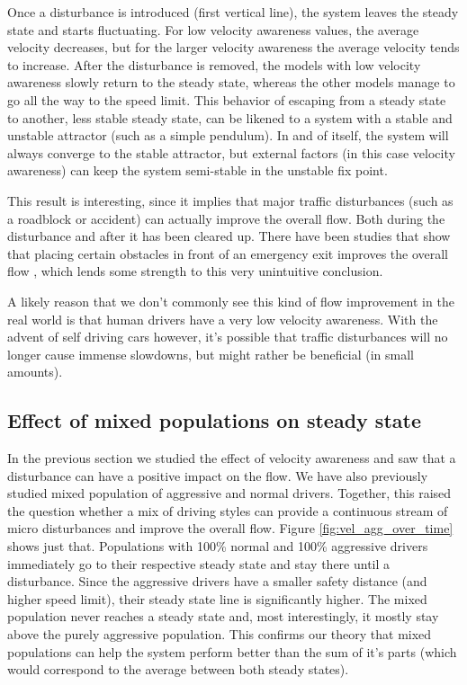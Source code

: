 \documentclass[11pt,a4paper,twocolumn]{article}
\begin{document}
Once a disturbance is introduced (first vertical line), the system leaves the steady state and starts fluctuating. For low velocity awareness values, the average velocity decreases, but for the larger velocity awareness the average velocity tends to increase.
After the disturbance is removed, the models with low velocity awareness slowly return to the steady state, whereas the other models manage to go all the way to the speed limit. This behavior of escaping from a steady state to another, less stable steady state, can be likened to a system with a stable and unstable attractor (such as a simple pendulum). In and of itself, the system will always converge to the stable attractor, but external factors (in this case velocity awareness) can keep the system semi-stable in the unstable fix point.

This result is interesting, since it implies that major traffic disturbances (such as a roadblock or accident) can actually improve the overall flow. Both during the disturbance and after it has been cleared up.
There have been studies that show that placing certain obstacles in front of an emergency exit improves the overall flow \cite{yanagisawa2009obstacle}, which lends some strength to this very unintuitive conclusion.

A likely reason that we don't commonly see this kind of flow improvement in the real world is that human drivers have a very low velocity awareness. With the advent of self driving cars however, it's possible that traffic disturbances  will no longer cause immense slowdowns, but might rather be beneficial (in small amounts).

\subsection{Effect of mixed populations on steady state}
In the previous section we studied the effect of velocity awareness and saw that a disturbance can have a positive impact on the flow. We have also previously studied mixed population of aggressive and normal drivers. Together, this raised the question whether a mix of driving styles can provide a continuous stream of micro disturbances and improve the overall flow. Figure \ref{fig:vel_agg_over_time} shows just that.
Populations with 100\% normal and 100\% aggressive drivers immediately go to their respective steady state and stay there until a disturbance. Since the aggressive drivers have a smaller safety distance (and higher speed limit), their steady state line is significantly higher. The mixed population never reaches a steady state and, most interestingly, it mostly stay above the purely aggressive population. This confirms our theory that mixed populations can help the system perform better than the sum of it's parts (which would correspond to the average between both steady states).
\end{document}
